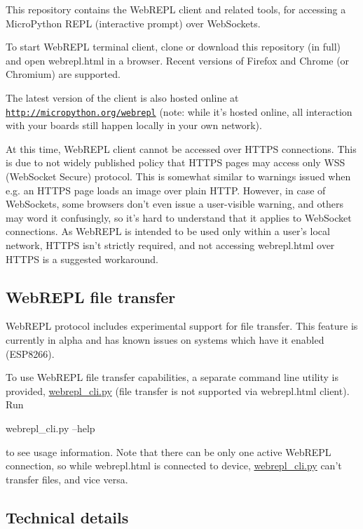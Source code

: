 This repository contains the Web\-R\-E\-P\-L client and related tools, for accessing a Micro\-Python R\-E\-P\-L (interactive prompt) over Web\-Sockets.

To start Web\-R\-E\-P\-L terminal client, clone or download this repository (in full) and open webrepl.\-html in a browser. Recent versions of Firefox and Chrome (or Chromium) are supported.

The latest version of the client is also hosted online at \href{http://micropython.org/webrepl}{\tt http\-://micropython.\-org/webrepl} (note\-: while it's hosted online, all interaction with your boards still happen locally in your own network).

At this time, Web\-R\-E\-P\-L client cannot be accessed over H\-T\-T\-P\-S connections. This is due to not widely published policy that H\-T\-T\-P\-S pages may access only W\-S\-S (Web\-Socket Secure) protocol. This is somewhat similar to warnings issued when e.\-g. an H\-T\-T\-P\-S page loads an image over plain H\-T\-T\-P. However, in case of Web\-Sockets, some browsers don't even issue a user-\/visible warning, and others may word it confusingly, so it's hard to understand that it applies to Web\-Socket connections. As Web\-R\-E\-P\-L is intended to be used only within a user's local network, H\-T\-T\-P\-S isn't strictly required, and not accessing webrepl.\-html over H\-T\-T\-P\-S is a suggested workaround.

\subsection*{Web\-R\-E\-P\-L file transfer }

Web\-R\-E\-P\-L protocol includes experimental support for file transfer. This feature is currently in alpha and has known issues on systems which have it enabled (E\-S\-P8266).

To use Web\-R\-E\-P\-L file transfer capabilities, a separate command line utility is provided, \hyperlink{webrepl__cli_8py}{webrepl\-\_\-cli.\-py} (file transfer is not supported via webrepl.\-html client). Run \begin{DoxyVerb}webrepl_cli.py --help
\end{DoxyVerb}


to see usage information. Note that there can be only one active Web\-R\-E\-P\-L connection, so while webrepl.\-html is connected to device, \hyperlink{webrepl__cli_8py}{webrepl\-\_\-cli.\-py} can't transfer files, and vice versa.

\subsection*{Technical details }

